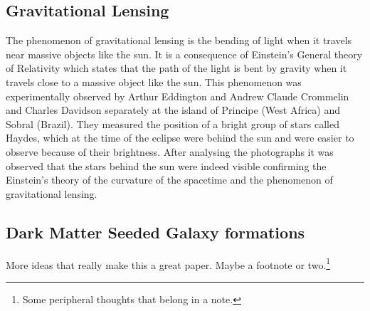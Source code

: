 
\subsection{Gravitational Lensing}
The phenomenon of gravitational lensing is the bending of light when it travels near massive objects like the sun. It is a consequence of Einstein's General theory of Relativity \citep{ch2:relativity} which states that the path of the light is bent by gravity when it travels close to a massive object like the sun. This phenomenon was experimentally observed by Arthur Eddington and Andrew Claude Crommelin and Charles Davidson separately at the island of Principe (West Africa) and Sobral (Brazil). They measured the position of a bright group of stars called Haydes, which at the time of the eclipse were behind the sun and were easier to observe because of their brightness. After analysing the photographs it was observed that the stars behind the sun were indeed visible confirming the Einstein's theory of the curvature of the spacetime and the phenomenon of gravitational lensing.

\subsection{Dark Matter Seeded Galaxy formations}

More ideas that really make this a great paper. Maybe a footnote or two.\footnote{Some peripheral thoughts that belong in a note.}

